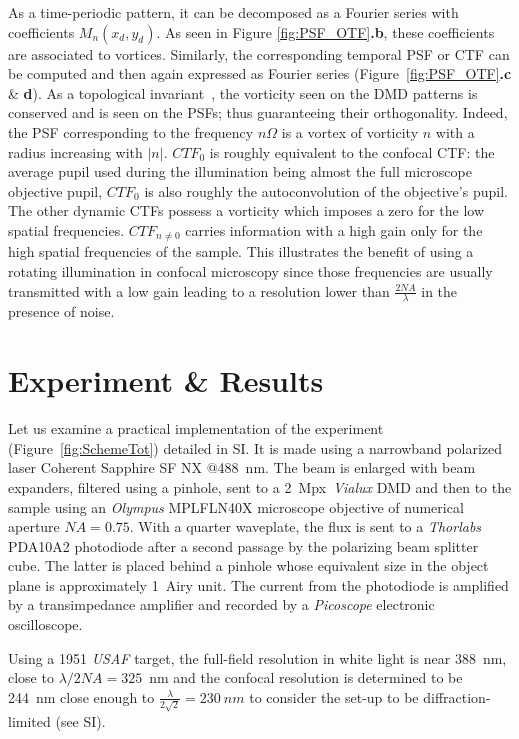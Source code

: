 \documentclass[%
reprint,
 amsmath,amssymb,
 aps,
]{revtex4-2}
\begin{document}
As a time-periodic pattern, it can be decomposed as a Fourier series with coefficients $M_n(x_d,y_d)$. As seen in Figure \ref{fig:PSF_OTF}\textbf{.b}, these coefficients are associated to vortices. Similarly, the corresponding temporal PSF or CTF can be computed and then again expressed as Fourier series (Figure~\ref{fig:PSF_OTF}\textbf{.c} \& \textbf{d}). As a topological invariant~\cite{VortexProp}, the vorticity seen on the DMD patterns is conserved and is seen on the PSFs; thus guaranteeing their orthogonality. Indeed, the PSF corresponding to the frequency $n\Omega$ is a vortex of vorticity $n$ with a radius increasing with $|n|$. $CTF_0$ is roughly equivalent to the confocal CTF: the average pupil used during the illumination being almost the full microscope objective pupil, $CTF_0$ is also roughly the autoconvolution of the objective's pupil. The other dynamic CTFs possess a vorticity which imposes a zero for the low spatial frequencies.  
$CTF_{n \neq 0}$ carries information with a high gain only for the high spatial frequencies of the sample.
This illustrates the benefit of using a rotating illumination in confocal microscopy since those frequencies are usually transmitted with a low gain leading to a resolution lower than $\frac{2N\!A}{\lambda}$ in the presence of noise. 

\section*{Experiment \& Results}

Let us examine a practical implementation of the experiment (Figure~\ref{fig:SchemeTot}) detailed in SI. It is made using a narrowband polarized laser Coherent Sapphire SF NX @488~nm. The beam is enlarged with beam expanders, filtered using a pinhole, sent to a 2~Mpx~\textit{Vialux} DMD and then to the sample using an \textit{Olympus} MPLFLN40X microscope objective of numerical aperture $N\!A=0.75$. With a quarter waveplate, the flux is sent to a \textit{Thorlabs} PDA10A2 photodiode after a second passage by the polarizing beam splitter cube. The latter is placed behind a pinhole whose equivalent size in the object plane is approximately 1~Airy unit. The current from the photodiode is amplified by a transimpedance amplifier and recorded by a \textit{Picoscope} electronic oscilloscope.

Using a 1951 \textit{USAF} target, the full-field resolution in white light is near 388~nm, close to $\lambda/2N\!A=325$~nm and the confocal resolution is determined to be 244~nm close enough to $\frac{\lambda}{2\sqrt{2}}=230~nm$ to consider the set-up to be diffraction-limited (see SI).
\end{document}
